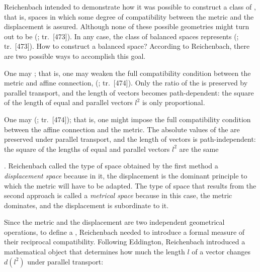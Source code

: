 \documentclass[submitted]{article}
\renewcommand{\rzlap}[2]{(\cite[#1]{Reichenbach1928}; tr.\ [#2])\xspace}
\begin{document}
Reichenbach intended to demonstrate how it was possible to construct a class of , that is, spaces in which some degree of compatibility between the metric and the displacement is assured. Although none of these possible geometries might turn out to be  \rzlap{339}{473}. In any case, the class of balanced spaces represents  \rzlap{339}{473}. How to construct a balanced space? According to Reichenbach, there are two possible ways to accomplish this goal. \begin{inparaenum}[(1)] \item One may ; that is, one may weaken the full compatibility condition between the metric and affine connection,  \rzlap{339}{474}. Only the ratio of the \gmn is preserved by parallel transport, and the length of vectors becomes path-dependent: the square of the length of equal and parallel vectors $l^2$ is only proportional. \item One may  \rzlap{339}{474}; that is, one might impose the full compatibility condition between the affine connection and the metric. The absolute values of the \gmn are preserved under parallel transport, and the length of vectors is path-independent: the square of the lengths of equal and parallel vectors $l^2$ are the same \end{inparaenum}. Reichenbach called the type of space obtained by the first method a \emph{displacement space} because in it, the displacement is the dominant principle to which the metric will have to be adapted. The type of space that results from the second approach is called a \emph{metrical space} because in this case, the metric dominates, and the displacement is subordinate to it.

Since the metric and the displacement are two independent geometrical operations, to define a , Reichenbach needed to introduce a formal measure of their reciprocal compatibility. Following Eddington, Reichenbach introduced a mathematical object that determines how much the length $l$ of a vector changes $d\left(l^{2}\right)$ under parallel transport:
\end{document}
